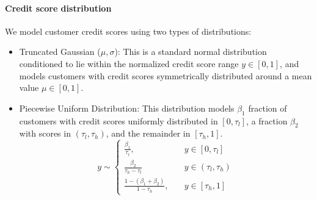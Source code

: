 
\paragraph{Credit score distribution} 
We model customer credit scores using two types of distributions:  

\begin{itemize}
    \item Truncated Gaussian (\(\mu, \sigma\)): This is a standard normal distribution conditioned to lie within the normalized credit score range \( y \in [0,1] \), and models customers with credit scores symmetrically distributed around a mean value $\mu \in [0,1]$.
    \item Piecewise Uniform Distribution: This distribution models \(\beta_1\) fraction of customers with credit scores uniformly distributed in \([0, \tau_l]\), a fraction \(\beta_2\) with scores in \((\tau_l, \tau_h)\), and the remainder in \([\tau_h, 1]\).
  \begin{equation}
    \label{eq:pu-dist}
    y \sim  
    \begin{cases}  
        \frac{\beta_1}{\tau_l}, & \quad y \in [0, \tau_l] \\[4pt]  
        \frac{\beta_2}{\tau_h - \tau_l} & \quad y \in (\tau_l, \tau_h) \\[4pt]  
        \frac{1 - (\beta_1 + \beta_2)}{1 - \tau_h}, & \quad y \in [\tau_h, 1]
    \end{cases}
\end{equation}  
\end{itemize}

